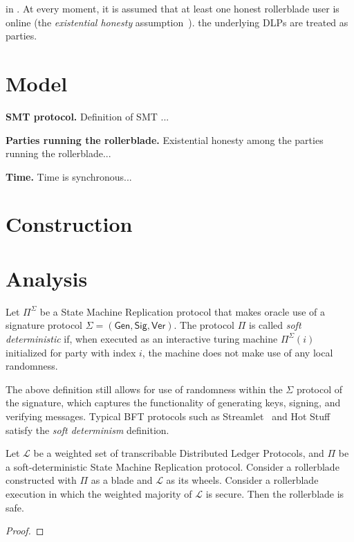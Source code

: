 in . At every moment, it is
assumed that at least one honest rollerblade user is online (the
\emph{existential honesty} assumption~\cite{backbone}).
the underlying DLPs are treated as parties.

\section{Model}

\noindent
\textbf{SMT protocol.}
Definition of SMT ...

\noindent
\textbf{Parties running the rollerblade.}
Existential honesty among the parties running the rollerblade...

\noindent
\textbf{Time.}
Time is synchronous...

\section{Construction}

\section{Analysis}

\begin{definition}[Transcribability]
\end{definition}

\begin{definition}
      Let $\Pi^\Sigma$ be a State Machine Replication protocol that makes
      oracle use of a signature protocol $\Sigma = (\textsf{Gen}, \textsf{Sig}, \textsf{Ver})$.
      The protocol $\Pi$ is called \emph{soft deterministic} if,
      when executed as an interactive turing machine $\Pi^\Sigma(i)$ initialized for party
      with index $i$, the machine does not make use of any local randomness.
\end{definition}

The above definition still allows for use of randomness within the $\Sigma$ protocol of the
signature, which captures the functionality of generating keys, signing, and verifying
messages. Typical BFT protocols such as Streamlet~\cite{streamlet} and Hot Stuff~\cite{hot-stuff}
satisfy the \emph{soft determinism} definition.

\begin{theorem}[Safety]
      Let $\mathcal{L}$ be a weighted set of transcribable Distributed Ledger Protocols,
      and $\Pi$ be a soft-deterministic State Machine Replication protocol.
      Consider a rollerblade constructed with $\Pi$ as a blade and
      $\mathcal{L}$ as its wheels.
      Consider a rollerblade execution in which the weighted majority of $\mathcal{L}$
      is secure.
      Then the rollerblade is safe.
\end{theorem}
\begin{proof}
\end{proof}

